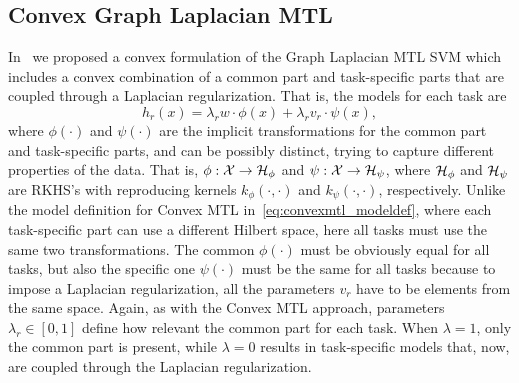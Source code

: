 \subsection{Convex Graph Laplacian MTL}



In~\cite{RuizAD21_hais} we proposed a convex formulation of the Graph Laplacian MTL SVM which includes a convex combination of a common part and task-specific parts that are coupled through a Laplacian regularization.
That is, the models for each task are
\begin{equation}
    \nonumber
    h_r(x) = \lambda_r w \cdot \phi(x) + \lambda_r v_r \cdot \psi(x) ,
\end{equation}
where $\phi(\cdot)$ and $\psi(\cdot)$ are the implicit transformations for the common part and task-specific parts, and can be possibly distinct, trying to capture different properties of the data.
That is, $\phi: \mathcal{X} \to \mathcal{H}_\phi$ and $\psi: \mathcal{X} \to \mathcal{H}_\psi$, where $\mathcal{H}_\phi$ and $\mathcal{H}_\psi$ are RKHS's with reproducing kernels $k_\phi(\cdot, \cdot)$ and $k_\psi(\cdot, \cdot)$, respectively.
Unlike the model definition for Convex MTL in~\eqref{eq:convexmtl_modeldef}, where each task-specific part can use a different Hilbert space, here all tasks must use the same two transformations. The common $\phi(\cdot)$ must be obviously equal for all tasks, but also the specific one $\psi(\cdot)$ must be the same for all tasks because to impose a Laplacian regularization, all the parameters $v_r$ have to be elements from the same space.
Again, as with the Convex MTL approach, parameters $\lambda_r \in [0, 1]$ define how relevant the common part for each task. When $\lambda=1$, only the common part is present, while $\lambda=0$ results in task-specific models that, now, are coupled through the Laplacian regularization.

